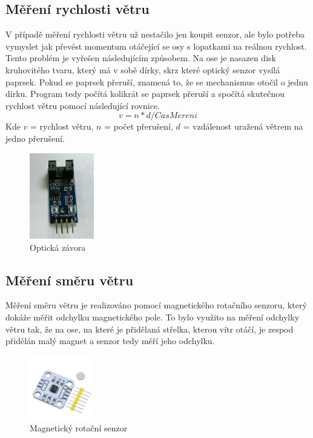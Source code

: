 \subsection{Měření rychlosti větru}
V případě měření rychlosti větru už nestačilo jen koupit senzor, ale bylo potřeba vymyslet jak převést momentum otáčející se osy s lopatkami na reálnou rychlost.
Tento problém je vyřešen následujícím způsobem. Na ose je nasazen disk kruhovitého tvaru, který má v sobě dírky, skrz které optický senzor vysílá paprsek. Pokud se paprsek přeruší,
znamená to, že se mechanismus otočil o jednu dírku. Program tedy počítá kolikrát se paprsek přeruší a spočítá skutečnou rychlost větru pomocí následující rovnice.
\begin{equation}
v = n * d / CasMereni 
\end{equation}
Kde $v$ = rychlost větru, $n$ = počet přerušení, $d$ = vzdálenost uražená větrem na jedno přerušení.

\begin{figure}[h] 
    \centering
    \includegraphics[width=0.25\textwidth]{images/ir_sensor.png}
    \caption{Optická závora}
\end{figure}

\subsection{Měření směru větru}
Měření směru větru je realizováno pomocí magnetického rotačního senzoru, který dokáže měřit odchylku magnetického pole. To bylo využito na měření odchylky větru tak, že na ose, na které je přidělaná střelka, kterou vítr otáčí, je zespod přidělán
malý magnet a senzor tedy měří jeho odchylku.

\begin{figure}[h] 
    \centering
    \includegraphics[width=0.25\textwidth]{images/AS5600.jpg}
    \caption{Magnetický rotační senzor}
\end{figure}

